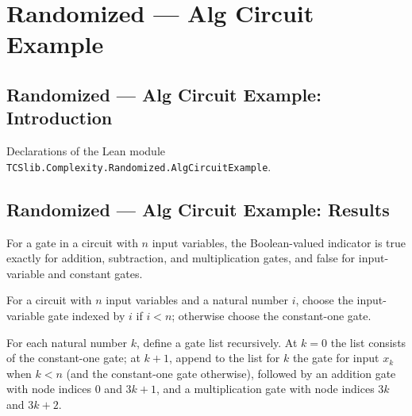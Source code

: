 \section{Randomized --- Alg Circuit Example}
\subsection*{Randomized --- Alg Circuit Example: Introduction}

Declarations of the Lean module \texttt{TCSlib.Complexity.Randomized.AlgCircuitExample}.

\subsection*{Randomized --- Alg Circuit Example: Results}

\begin{definition}
\label{Randomized.AlgGate.isOp}
\leanok
{}
For a gate in a circuit with $n$ input variables, the Boolean-valued indicator is true
exactly for addition, subtraction, and multiplication gates, and false for
input-variable and constant gates.
\end{definition}

\begin{definition}
\label{Randomized.AlgCircuit.varOrOne}
\leanok
{}
For a circuit with $n$ input variables and a natural number $i$, choose the
input-variable gate indexed by $i$ if $i<n$; otherwise choose the constant-one gate.
\end{definition}

\begin{definition}
\label{Randomized.AlgCircuit.prodOnePlusGates}
\leanok
{}
For each natural number $k$, define a gate list recursively. At $k=0$ the list consists
of the constant-one gate; at $k+1$, append to the list for $k$ the gate for input $x_k$
when $k<n$ (and the constant-one gate otherwise), followed by an addition gate with node
indices $0$ and $3k+1$, and a multiplication gate with node indices $3k$ and $3k+2$.
\end{definition}

